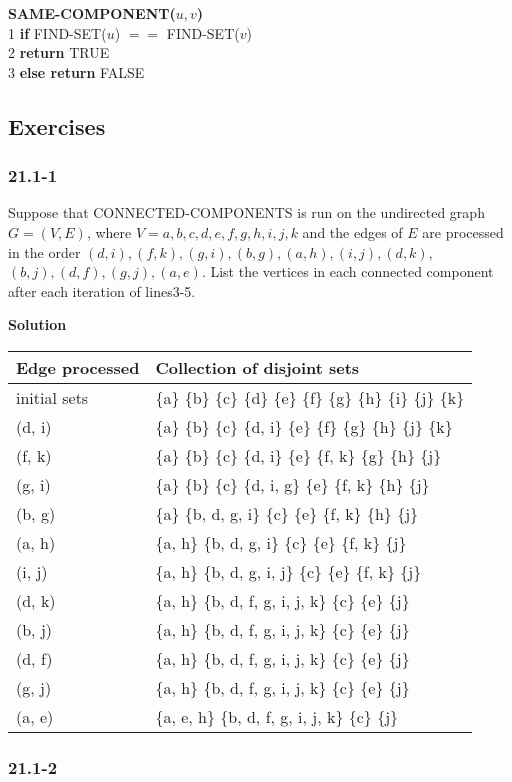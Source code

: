 \textbf{SAME-COMPONENT($u, v$)}\\
1\hspace*{2ex} \textbf{if} FIND-SET($u$) $==$ FIND-SET($v$)\\
2\hspace*{4ex} \textbf{return} TRUE\\
3\hspace*{2ex} \textbf{else return} FALSE

\subsection {Exercises}

\subsubsection {21.1-1}

Suppose that CONNECTED-COMPONENTS is run on the undirected graph $G = (V, E)$,
where $V = { a, b, c, d, e, f, g, h, i, j, k }$ and the edges of $E$ are
processed in the order $(d, i), (f, k), (g, i), (b, g), (a, h), (i, j), (d, k),$
$(b, j), (d, f), (g, j), (a, e)$. List the vertices in each connected component
after each iteration of lines3-5.

\textbf{Solution}

\begin{tabular}{l|l}
Edge processed & Collection of disjoint sets \\
\hline
initial sets   & \{a\} \{b\} \{c\} \{d\} \{e\} \{f\} \{g\} \{h\} \{i\} \{j\} \{k\} \\
(d, i)         & \{a\} \{b\} \{c\} \{d, i\} \{e\} \{f\} \{g\} \{h\} \{j\} \{k\} \\
(f, k)         & \{a\} \{b\} \{c\} \{d, i\} \{e\} \{f, k\} \{g\} \{h\} \{j\} \\
(g, i)         & \{a\} \{b\} \{c\} \{d, i, g\} \{e\} \{f, k\} \{h\} \{j\} \\
(b, g)         & \{a\} \{b, d, g, i\} \{c\} \{e\} \{f, k\} \{h\} \{j\} \\
(a, h)         & \{a, h\} \{b, d, g, i\} \{c\} \{e\} \{f, k\} \{j\} \\
(i, j)         & \{a, h\} \{b, d, g, i, j\} \{c\} \{e\} \{f, k\} \{j\} \\
(d, k)         & \{a, h\} \{b, d, f, g, i, j, k\} \{c\} \{e\} \{j\} \\
(b, j)         & \{a, h\} \{b, d, f, g, i, j, k\} \{c\} \{e\} \{j\} \\
(d, f)         & \{a, h\} \{b, d, f, g, i, j, k\} \{c\} \{e\} \{j\} \\
(g, j)         & \{a, h\} \{b, d, f, g, i, j, k\} \{c\} \{e\} \{j\} \\
(a, e)         & \{a, e, h\} \{b, d, f, g, i, j, k\} \{c\} \{j\} \\
\end{tabular}

\subsubsection {21.1-2}



